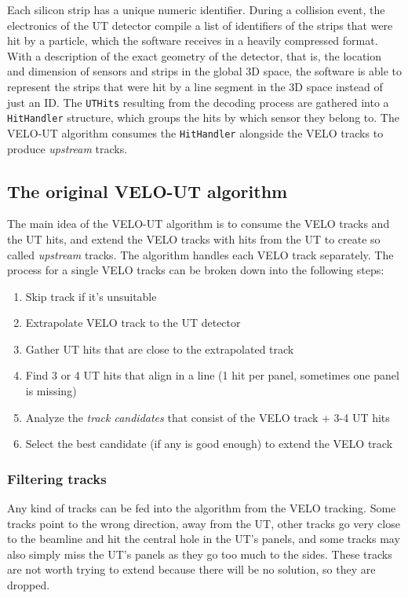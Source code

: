 \documentclass[12pt]{article}
\newcommand{\code}[1]{\texttt{#1}}
\begin{document}
Each silicon strip has a unique numeric identifier. During a collision event, the electronics of the UT detector compile a list of identifiers of the strips that were hit by a particle, which the software receives in a heavily compressed format. With a description of the exact geometry of the detector, that is, the location and dimension of sensors and strips in the global 3D space, the software is able to represent the strips that were hit by a line segment in the 3D space instead of just an ID. The \code{UTHits} resulting from the  decoding process are gathered into a \code{HitHandler} structure, which groups the hits by which sensor they belong to. The VELO-UT algorithm consumes the \code{HitHandler} alongside the VELO tracks to produce \textit{upstream} tracks.


\subsection{The original VELO-UT algorithm}\label{sec_velout_desc}

The main idea of the VELO-UT algorithm is to consume the VELO tracks and the UT hits, and extend the VELO tracks with hits from the UT to create so called \textit{upstream} tracks. The algorithm handles each VELO track separately. The process for a single VELO tracks can be broken down into the following steps:

\begin{enumerate}
	\item Skip track if it's unsuitable
	\item Extrapolate VELO track to the UT detector
	\item Gather UT hits that are close to the extrapolated track
	\item Find 3 or 4 UT hits that align in a line (1 hit per panel, sometimes one panel is missing)
	\item Analyze the \textit{track candidates} that consist of the VELO track + 3-4 UT hits
	\item Select the best candidate (if any is good enough) to extend the VELO track
\end{enumerate}


\subsubsection{Filtering tracks}

Any kind of tracks can be fed into the algorithm from the VELO tracking. Some tracks point to the wrong direction, away from the UT, other tracks go very close to the beamline and hit the central hole in the UT's panels, and some tracks may also simply miss the UT's panels as they go too much to the sides. These tracks are not worth trying to extend because there will be no solution, so they are dropped.
\end{document}
